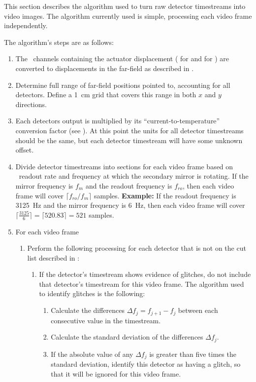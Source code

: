 This section describes the algorithm used to turn raw detector timestreams into video images.
The algorithm currently used is simple, processing each video frame independently.

The algorithm's steps are as follows:
\begin{enumerate}
\item The  \MCE\ channels containing the actuator displacement ( for  and  for ) are converted to displacements in the far-field as described in .
\item Determine full range of far-field positions pointed to, accounting for all detectors. Define a \SI{1}{\cm} grid that covers this range in both $x$ and $y$ directions.
\item Each detectors output is multiplied by its ``current-to-temperature'' conversion factor (see ). At this point the units for all detector timestreams should be the same, but each detector timestream will have some unknown offset.
\item Divide detector timestreams into sections for each video frame based on \MCE\ readout rate and frequency at which the secondary mirror is rotating.
  If the mirror frequency is $f_m$ and the readout frequency is $f_{ro}$, then each video frame will cover $\lceil f_{ro} / f_{m} \rceil$ samples.
  \textbf{Example:} If the readout frequency is \SI{3125}{\Hz} and the mirror frequency is \SI{6}{\Hz}, then each video frame will cover $\lceil\frac{3125}{6}\rceil = \lceil 520.83 \rceil = 521$ samples.
\item For each video frame
  \begin{enumerate}
  \item Perform the following processing for each detector that is not on the cut list described in :
    \begin{enumerate}
    \item If the detector's timestream shows evidence of glitches, do not include that detector's timestream for this video frame. The algorithm used to identify glitches is the following:
      \begin{enumerate}
      \item Calculate the differences $\Delta f_j = f_{j+1} - f_j$ between each consecutive value in the timestream.
      \item Calculate the standard deviation of the differences $\Delta f_j$.
      \item If the absolute value of any $\Delta f_j$ is greater than five times the standard deviation, identify this detector as having a glitch, so that it will be ignored for this video frame.

\end{enumerate}
\end{enumerate}
\end{enumerate}
\end{enumerate}
